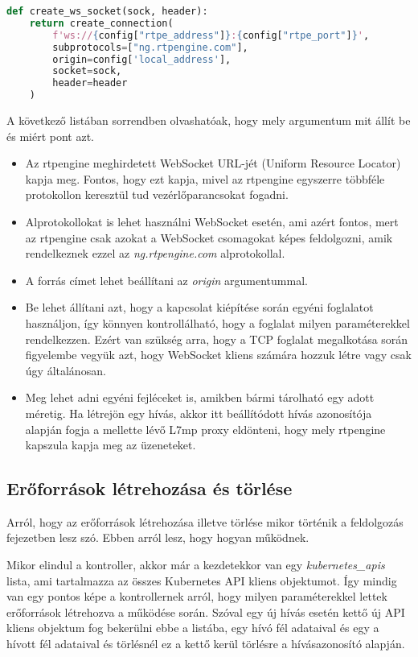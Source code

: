 \begin{lstlisting}[language=python, caption=WebSocket foglalat létrehozása, label=lst:wssock]
def create_ws_socket(sock, header):
	return create_connection(
		f'ws://{config["rtpe_address"]}:{config["rtpe_port"]}',
		subprotocols=["ng.rtpengine.com"],
		origin=config['local_address'],
		socket=sock,
		header=header
	)
\end{lstlisting}

A következő listában sorrendben olvashatóak, hogy mely argumentum mit állít be és miért
pont azt.

\begin{itemize}
	\item Az rtpengine meghirdetett WebSocket URL-jét (Uniform Resource Locator) kapja 
	meg. Fontos, hogy ezt kapja, mivel az rtpengine egyszerre többféle protokollon keresztül tud 
	vezérlőparancsokat fogadni.
	\item Alprotokollokat is lehet használni WebSocket esetén, ami azért fontos, mert
	az rtpengine csak azokat a WebSocket csomagokat képes feldolgozni, amik rendelkeznek
	ezzel az \textit{ng.rtpengine.com} alprotokollal.
	\item A forrás címet lehet beállítani az \textit{origin} argumentummal. 
	\item Be lehet állítani azt, hogy a kapcsolat kiépítése során egyéni foglalatot
	használjon, így könnyen kontrollálható, hogy a foglalat milyen paraméterekkel 
	rendelkezzen. Ezért van szükség arra, hogy a TCP foglalat megalkotása során
	figyelembe vegyük azt, hogy WebSocket kliens számára hozzuk létre vagy csak úgy
	általánosan.
	\item Meg lehet adni egyéni fejléceket is, amikben bármi tárolható egy adott
	méretig. Ha létrejön egy hívás, akkor itt beállítódott hívás azonosítója alapján
	fogja a mellette lévő L7mp proxy eldönteni, hogy mely rtpengine kapszula kapja
	meg az üzeneteket.
\end{itemize}

\subsection{Erőforrások létrehozása és törlése}

Arról, hogy az erőforrások létrehozása illetve törlése mikor történik a feldolgozás
fejezetben lesz szó. Ebben arról lesz, hogy hogyan működnek.

Mikor elindul a kontroller, akkor már a kezdetekkor van egy \textit{kubernetes\_apis}
lista, ami tartalmazza az összes Kubernetes API kliens objektumot. Így mindig van egy
pontos képe a kontrollernek arról, hogy milyen paraméterekkel lettek erőforrások 
létrehozva a működése során. Szóval egy új hívás esetén kettő új API kliens objektum 
fog bekerülni ebbe a listába, egy hívó fél adataival és egy a hívott fél adataival 
és törlésnél ez a kettő kerül törlésre a hívásazonosító alapján. 

